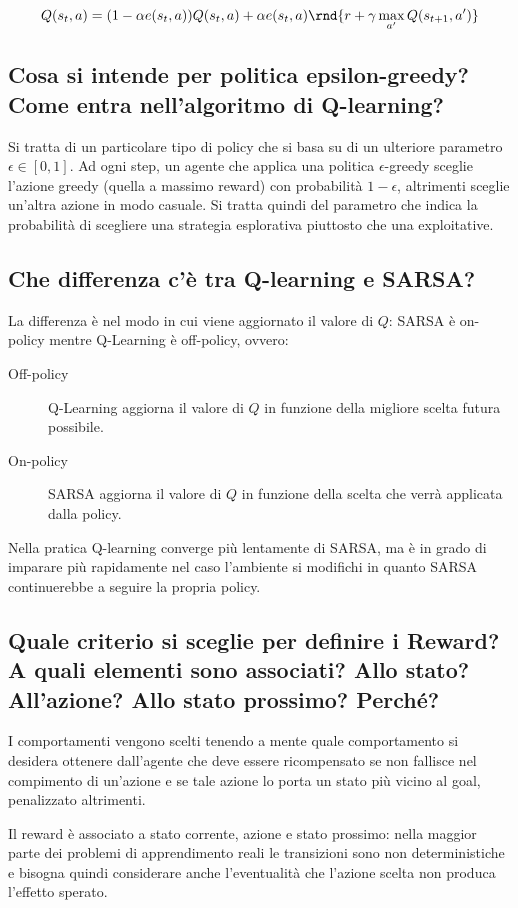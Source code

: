 \documentclass[\main/main.tex]{subfiles}
\begin{document}
\[
  Q(s_t,a) = (1-\alpha e(s_t,a))Q(s_t,a) + \alpha e(s_t,a)\rnd{r+\gamma\max_{a'}Q(s_{t+1},a')}
\]

\subsection{Cosa si intende per politica epsilon-greedy? Come entra nell'algoritmo di Q-learning? }
Si tratta di un particolare tipo di policy che si basa su di un ulteriore parametro $\epsilon \in [0,1]$. Ad ogni step, un agente che applica una politica $\epsilon$-greedy sceglie l'azione greedy (quella a massimo reward) con probabilità $1-\epsilon$, altrimenti sceglie un'altra azione in modo casuale. Si tratta quindi del parametro che indica la probabilità di scegliere una strategia esplorativa piuttosto che una exploitative.

\subsection{Che differenza c'è tra Q-learning e SARSA?}
La differenza è nel modo in cui viene aggiornato il valore di $Q$: SARSA è on-policy mentre Q-Learning è off-policy, ovvero:
\begin{description}
  \item[Off-policy] Q-Learning aggiorna il valore di $Q$ in funzione della migliore scelta futura possibile.
  \item[On-policy] SARSA aggiorna il valore di $Q$ in funzione della scelta che verrà applicata dalla policy.
\end{description}
Nella pratica Q-­learning converge più lentamente di SARSA, ma è in grado di imparare più rapidamente nel caso l'ambiente si modifichi in quanto SARSA continuerebbe a seguire la propria policy.

\subsection{Quale criterio si sceglie per definire i Reward? A quali elementi sono associati? Allo stato? All'azione? Allo stato prossimo? Perché?}
I comportamenti vengono scelti tenendo a mente quale comportamento si desidera ottenere dall'agente che deve essere ricompensato se non fallisce nel compimento di un'azione e se tale azione lo porta un stato più vicino al goal, penalizzato altrimenti.

Il reward è associato a stato corrente, azione e stato prossimo: nella maggior parte dei problemi di apprendimento reali le transizioni sono non deterministiche e bisogna quindi considerare anche l'eventualità che l'azione scelta non produca l'effetto sperato.
\end{document}
